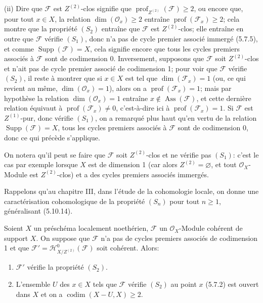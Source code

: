 (ii) Dire que $\mathcal F$ est $Z^{(2)}$-clos signifie que
$\operatorname{prof}_{Z^{(2)}}(\mathcal F)\geq2$, ou encore que, pour tout
$x\in X$, la relation $\dim(\mathcal O_x)\geq2$ entraîne
$\operatorname{prof}(\mathcal F_x)\geq2$; cela montre que la propriété $(S_2)$
entraîne que $\mathcal F$ est $Z^{(2)}$-clos; elle entraîne en outre que
$\mathcal F$ vérifie $(S_1)$, donc n'a pas de cycle premier associé immergé
(5.7.5), et comme $\operatorname{Supp}(\mathcal F)=X$, cela signifie encore
que tous les cycles premiers associés à $\mathcal F$ sont de codimension 0.
Inversement, supposons que $\mathcal F$ soit $Z^{(2)}$-clos et n'ait pas de
cycle premier associé de codimension 1; pour voir que $\mathcal F$ vérifie
$(S_2)$, il reste à montrer que si $x\in X$ est tel que
$\dim(\mathcal F_x)=1$ (ou, ce qui revient au même,
$\dim(\mathcal O_x)=1$), alors on a $\operatorname{prof}(\mathcal F_x)=1$;
mais par hypothèse la relation $\dim(\mathcal O_x)=1$ entraîne
$x\notin\operatorname{Ass}(\mathcal F)$, et cette dernière relation équivaut à
$\operatorname{prof}(\mathcal F_x)\neq0$, c'est-à-dire ici à
$\operatorname{prof}(\mathcal F_x)=1$. Si $\mathcal F$ est $Z^{(1)}$-pur,
donc vérifie $(S_1)$, on a remarqué plus haut qu'en vertu de la relation
$\operatorname{Supp}(\mathcal F)=X$, tous les cycles premiers associés à
$\mathcal F$ sont de codimension 0, donc ce qui précède s'applique.

On notera qu'il peut se faire que $\mathcal F$ soit $Z^{(2)}$-clos et ne
vérifie pas $(S_1)$: c'est le cas par exemple lorsque $X$ est de dimension 1
(car alors $Z^{(2)}=\varnothing$, et tout $\mathcal O_X$-Module est
$Z^{(2)}$-clos) et a des cycles premiers associés immergés.

Rappelons qu'au chapitre III, dans l'étude de la cohomologie locale, on donne
une caractérisation cohomologique de la propriété $(S_n)$ pour tout $n\geq1$,
généralisant (5.10.14).

\begin{corollary}[5.10.15]
\label{IV.2.s5.10.15-fr}
Soient $X$ un préschéma localement noethérien, $\mathcal F$ un
$\mathcal O_X$-Module cohérent de support $X$. On suppose que $\mathcal F$
n'a pas de cycles premiers associés de codimension 1 et que
$\mathcal F'=\mathcal H^0_{X/Z^{(2)}}(\mathcal F)$ soit cohérent. Alors:
\begin{enumerate}
\item[(i)] $\mathcal F'$ vérifie la propriété $(S_2)$.


\item[(ii)] L'ensemble $U$ des $x\in X$ tels que $\mathcal F$ vérifie $(S_2)$
au point $x$ (5.7.2) est ouvert dans $X$ et on a
$\operatorname{codim}(X-U,X)\geq2$.
\end{enumerate}
\end{corollary}

